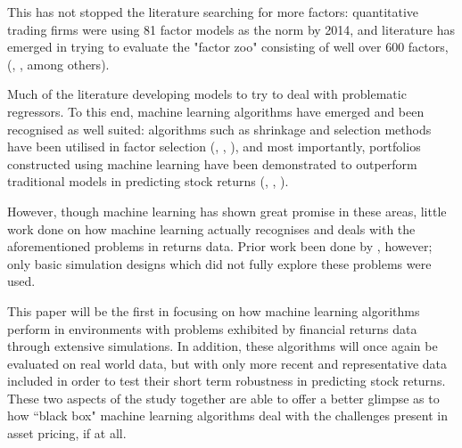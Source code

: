\documentclass[a4paper]{article}
\begin{document}
	This has not stopped the literature searching for more factors: quantitative trading firms were using 81 factor models as the norm \citep{hsu_finding_2014} by 2014, and literature has emerged in trying to evaluate the "factor zoo" consisting of well over 600 factors, (\cite{harvey__2016}, \cite{harvey_census_2019}, among others).
	
	Much of the literature developing models to try to deal with problematic regressors. To this end, machine learning algorithms have emerged and been recognised as well suited: algorithms such as shrinkage and selection methods have been utilised in factor selection (\cite{kozak_shrinking_2017}, \cite{rapach_forecasting_2013}, \cite{freyberger_dissecting_2017}), and most importantly, portfolios constructed using machine learning have been demonstrated to outperform traditional models in predicting stock returns (\cite{gu_empirical_2018}, \cite{hsu_finding_2014}, \cite{feng_deep_2018}). 
	
	However, though machine learning has shown great promise in these areas, little work done on how machine learning actually recognises and deals with the aforementioned problems in returns data. Prior work been done by \cite{gu_empirical_2018}, however; only basic simulation designs which did not fully explore these problems were used.
	
	This paper will be the first in focusing on how machine learning algorithms perform in environments with problems exhibited by financial returns data through extensive simulations. In addition, these algorithms will once again be evaluated on real world data, but with only more recent and representative data included in order to test their short term robustness in predicting stock returns. These two aspects of the study together are able to offer a better glimpse as to how ``black box" machine learning algorithms deal with the challenges present in asset pricing, if at all.
	
	
	
\end{document}
